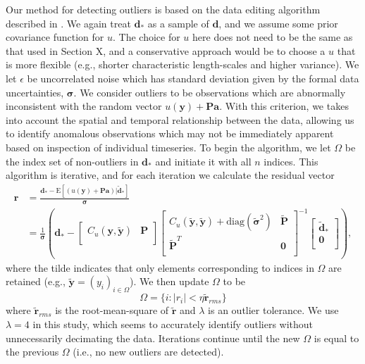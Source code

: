 \documentclass[10pt,a4paper]{article}
\begin{document}
Our method for detecting outliers is based on the data editing algorithm described in \citet{Gibbs2011}.  We again treat $\bm{d}_*$ as a sample of $\bm{d}$, and we assume some prior covariance function for $u$. The choice for $u$ here does not need to be the same as that used in Section X, and a conservative approach would be to choose a $u$ that is more flexible (e.g., shorter characteristic length-scales and higher variance).  We let $\epsilon$ be uncorrelated noise which has standard deviation given by the formal data uncertainties, $\bm{\sigma}$. We consider outliers to be observations which are abnormally inconsistent with the random vector $u(\bm{y}) + \bm{P}\bm{a}$.  With this criterion, we takes into account the spatial and temporal relationship between the data, allowing us to identify anomalous observations which may not be immediately apparent based on inspection of individual timeseries. To begin the algorithm, we let $\Omega$ be the index set of non-outliers in $\bm{d}_*$ and initiate it with all $n$ indices. This algorithm is iterative, and for each iteration we calculate the residual vector
\begin{align}\label{eq:Residual}
\bm{r} &= \frac{\bm{d}_* - \mathrm{E}\left[(u(\bm{y}) + \bm{P}\bm{a})|\tilde{\bm{d}}_* \right]}{\bm{\sigma}} \\
       &= \frac{1}{\bm{\sigma}}\left(\bm{d}_*  - 
\left[ 
\begin{array}{cc}
C_u(\bm{y},\tilde{\bm{y}}) & \bm{P} \\
\end{array}
\right]
\left[
\begin{array}{cc}
C_u(\tilde{\bm{y}},\tilde{\bm{y}}) + \mathrm{diag}(\tilde{\bm{\sigma}}^2) & \tilde{\bm{P}} \\
\tilde{\bm{P}}^T  & \bm{0} \\
\end{array}
\right]^{-1}
\left[
\begin{array}{c}
\tilde{\bm{d}}_* \\
\bm{0} \\
\end{array}
\right] 
\right),
\end{align}
where the tilde indicates that only elements corresponding to indices in $\Omega$ are retained (e.g., $\tilde{\bm{y}} = (y_i)_{i\in\Omega}$). We then update $\Omega$ to be
\begin{equation}\label{eq:Update}
\Omega = \{i : |r_i| < \eta \tilde{\bm{r}}_{rms}\}
\end{equation} 
where $\tilde{\bm{r}}_{rms}$ is the root-mean-square of $\tilde{\bm{r}}$ and $\lambda$ is an outlier tolerance. We use $\lambda=4$ in this study, which seems to accurately identify outliers without unnecessarily decimating the data. Iterations continue until the new $\Omega$ is equal to the previous $\Omega$ (i.e., no new outliers are detected). 
\end{document}
